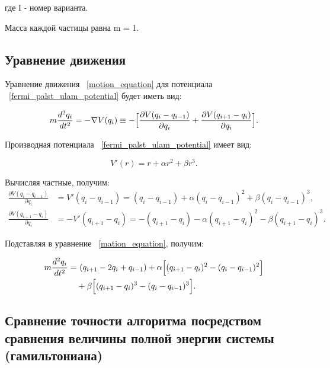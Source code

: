 \documentclass[14pt,a4paper]{extarticle}
\theoremstyle{plain}
\begin{document}
	где I - номер варианта.
	
	Масса каждой частицы равна m = 1.
	
	\subsection{Уравнение движения}
	
	Уравнение движения ~\eqref{motion_equation} для потенциала ~\eqref{fermi_palst_ulam_potential} будет иметь вид:
	
	\begin{equation}
		m\dfrac{d^2 q_i}{dt^2} = -\nabla V(q_i) \equiv -\Bigl[\dfrac{\partial V(q_i - q_{i-1})}{\partial q_i} + \dfrac{\partial V(q_{i+1} - q_{i})}{\partial q_i}\Bigr].
		\label{mation_equation}
	\end{equation}
	
	Производная потенциала ~\eqref{fermi_palst_ulam_potential} имеет вид:
	
	\begin{equation}
		V'(r) = r + \alpha r^2 + \beta r^3.
		\nonumber
	\end{equation}
	
	Вычисляя частные, получим:
	\begin{align}
		\frac{\partial V(q_i - q_{i-1})}{\partial q_i} &= V'(q_i - q_{i-1}) = (q_i - q_{i-1}) + \alpha(q_i - q_{i-1})^2 + \beta(q_i - q_{i-1})^3, \nonumber \\
		\frac{\partial V(q_{i+1} - q_i)}{\partial q_i} &= -V'(q_{i+1} - q_i) = -(q_{i+1} - q_i) - \alpha(q_{i+1} - q_i)^2 - \beta(q_{i+1} - q_i)^3.
		\nonumber
	\end{align}
	
	Подставляя в уравнение ~\ref{mation_equation}, получим:
	
	\begin{equation}
		\begin{aligned}
			m\frac{d^2 q_i}{dt^2} = &\ (q_{i+1} - 2q_i + q_{i-1})
			+ \alpha\Bigl[(q_{i+1} - q_i)^2 - (q_i - q_{i-1})^2\Bigr] \\
			&+ \beta\Bigl[(q_{i+1} - q_i)^3 - (q_i - q_{i-1})^3\Bigr].
		\end{aligned}
		\label{full_motion_equation}
		\nonumber
	\end{equation}
	
	\subsection{Сравнение точности алгоритма посредством сравнения величины полной энергии системы (гамильтониана)}
	
\end{document}
